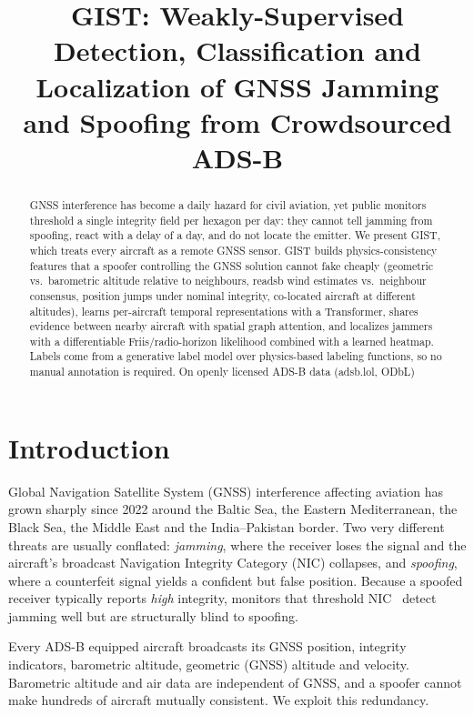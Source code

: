\documentclass[conference]{IEEEtran}
\begin{document}
\title{GIST: Weakly-Supervised Detection, Classification and Localization of GNSS Jamming and Spoofing from Crowdsourced ADS-B}
\author{}
\maketitle

\begin{abstract}
GNSS interference has become a daily hazard for civil aviation, yet public monitors threshold a single
integrity field per hexagon per day: they cannot tell jamming from spoofing, react with a delay of a day,
and do not locate the emitter. We present GIST, which treats every aircraft as a remote GNSS sensor.
GIST builds physics-consistency features that a spoofer controlling the GNSS solution cannot fake cheaply
(geometric vs.\ barometric altitude relative to neighbours, readsb wind estimates vs.\ neighbour consensus,
position jumps under nominal integrity, co-located aircraft at different altitudes), learns per-aircraft
temporal representations with a Transformer, shares evidence between nearby aircraft with spatial graph
attention, and localizes jammers with a differentiable Friis/radio-horizon likelihood combined with a learned
heatmap. Labels come from a generative label model over physics-based labeling functions, so no manual
annotation is required. On openly licensed ADS-B data (adsb.lol, ODbL) \resultsabstract
\end{abstract}

\section{Introduction}
Global Navigation Satellite System (GNSS) interference affecting aviation has grown sharply since 2022
around the Baltic Sea, the Eastern Mediterranean, the Black Sea, the Middle East and the India--Pakistan
border. Two very different threats are usually conflated: \emph{jamming}, where the receiver loses the
signal and the aircraft's broadcast Navigation Integrity Category (NIC) collapses, and \emph{spoofing},
where a counterfeit signal yields a confident but false position. Because a spoofed receiver typically
reports \emph{high} integrity, monitors that threshold NIC~\cite{gpsjam} detect jamming well but are
structurally blind to spoofing.

Every ADS-B equipped aircraft broadcasts its GNSS position, integrity indicators, barometric altitude,
geometric (GNSS) altitude and velocity. Barometric altitude and air data are independent of GNSS, and a
spoofer cannot make hundreds of aircraft mutually consistent. We exploit this redundancy.
\end{document}
